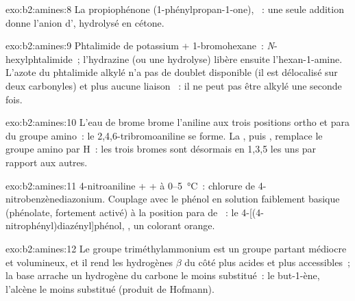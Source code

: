 \begin{solution}{exo:b2:amines:8}
La propiophénone (1-phénylpropan-1-one), ~: une seule addition donne l'anion
d', hydrolysé en cétone.
\end{solution}

\begin{solution}{exo:b2:amines:9}
Phtalimide de potassium + 1-bromohexane~: \textit{N}-hexylphtalimide~; l'hydrazine (ou une hydrolyse)
libère ensuite l'hexan-1-amine. L'azote du phtalimide alkylé n'a pas de doublet disponible (il est
délocalisé sur deux carbonyles) et plus aucune liaison ~: il ne peut pas être alkylé une seconde fois.
\end{solution}

\begin{solution}{exo:b2:amines:10}
L'eau de brome brome l'aniline aux trois positions ortho et para du groupe amino~: le
2,4,6-tribromoaniline se forme. La , puis , remplace le groupe amino par H~: les trois
bromes sont désormais en 1,3,5 les uns par rapport aux autres.
\end{solution}

\begin{solution}{exo:b2:amines:11}
4-nitroaniline +  +  à 0--\qty{5}{\degreeCelsius}~: chlorure de
4-nitrobenzènediazonium. Couplage avec le phénol en solution faiblement basique (phénolate, fortement
activé) à la position para de ~: le 4-[(4-nitrophényl)diazényl]phénol, ,
un colorant orange.
\end{solution}

\begin{solution}{exo:b2:amines:12}
Le groupe triméthylammonium est un groupe partant médiocre et volumineux, et il rend les hydrogènes $\beta$
du côté  plus acides et plus accessibles~; la base arrache un hydrogène du carbone le moins
substitué~: le but-1-ène, l'alcène le moins substitué (produit de Hofmann).
\end{solution}

